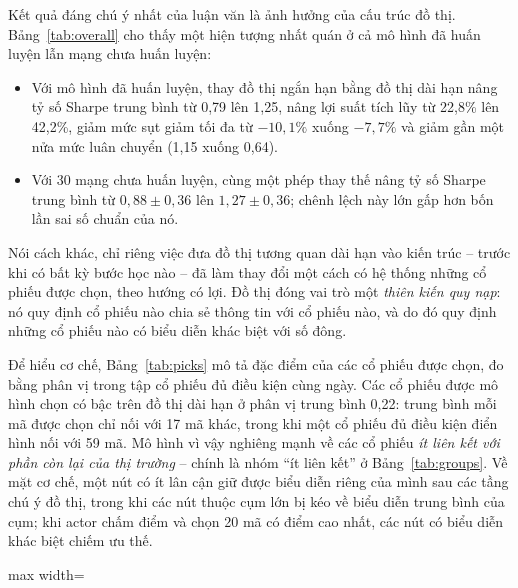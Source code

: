 Kết quả đáng chú ý nhất của luận văn là ảnh hưởng của cấu trúc đồ thị. Bảng~\ref{tab:overall} cho thấy một hiện tượng nhất quán ở cả mô hình đã huấn luyện lẫn mạng chưa huấn luyện:
\begin{itemize}
  \item Với mô hình đã huấn luyện, thay đồ thị ngắn hạn bằng đồ thị dài hạn nâng tỷ số Sharpe trung bình từ 0,79 lên 1,25, nâng lợi suất tích lũy từ 22,8\% lên 42,2\%, giảm mức sụt giảm tối đa từ $-10{,}1\%$ xuống $-7{,}7\%$ và giảm gần một nửa mức luân chuyển (1,15 xuống 0,64).
  \item Với 30 mạng chưa huấn luyện, cùng một phép thay thế nâng tỷ số Sharpe trung bình từ $0{,}88\pm0{,}36$ lên $1{,}27\pm0{,}36$; chênh lệch này lớn gấp hơn bốn lần sai số chuẩn của nó.
\end{itemize}
Nói cách khác, chỉ riêng việc đưa đồ thị tương quan dài hạn vào kiến trúc -- trước khi có bất kỳ bước học nào -- đã làm thay đổi một cách có hệ thống những cổ phiếu được chọn, theo hướng có lợi. Đồ thị đóng vai trò một \emph{thiên kiến quy nạp}: nó quy định cổ phiếu nào chia sẻ thông tin với cổ phiếu nào, và do đó quy định những cổ phiếu nào có biểu diễn khác biệt với số đông.

Để hiểu cơ chế, Bảng~\ref{tab:picks} mô tả đặc điểm của các cổ phiếu được chọn, đo bằng phân vị trong tập cổ phiếu đủ điều kiện cùng ngày. Các cổ phiếu được mô hình chọn có bậc trên đồ thị dài hạn ở phân vị trung bình 0,22: trung bình mỗi mã được chọn chỉ nối với 17 mã khác, trong khi một cổ phiếu đủ điều kiện điển hình nối với 59 mã. Mô hình vì vậy nghiêng mạnh về các cổ phiếu \emph{ít liên kết với phần còn lại của thị trường} -- chính là nhóm ``ít liên kết'' ở Bảng~\ref{tab:groups}. Về mặt cơ chế, một nút có ít lân cận giữ được biểu diễn riêng của mình sau các tầng chú ý đồ thị, trong khi các nút thuộc cụm lớn bị kéo về biểu diễn trung bình của cụm; khi actor chấm điểm và chọn 20 mã có điểm cao nhất, các nút có biểu diễn khác biệt chiếm ưu thế.

\begin{table}[ht]
\centering\footnotesize
\setlength{\tabcolsep}{4pt}
\caption{Đặc điểm của các cổ phiếu được chọn trên tập kiểm tra}
\label{tab:picks}
\begin{adjustbox}{max width=\textwidth}\end{adjustbox}
\end{table}


